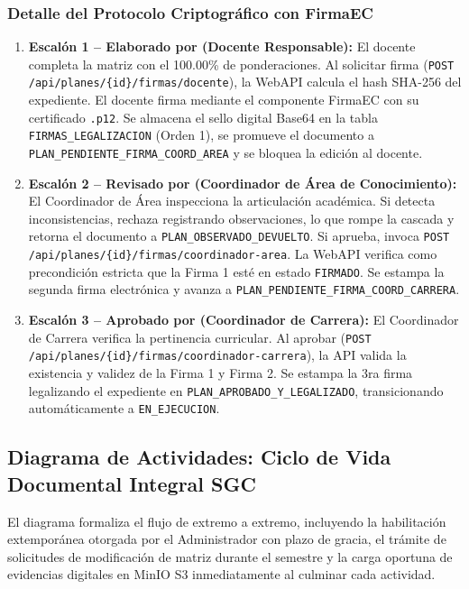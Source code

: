 \documentclass[12pt,a4paper]{article}
\begin{document}
\subsubsection{Detalle del Protocolo Criptográfico con FirmaEC}
\begin{enumerate}[leftmargin=1.5em, itemsep=1.5pt]
    \item \textbf{Escalón 1 -- Elaborado por (Docente Responsable):}
    El docente completa la matriz con el 100.00\% de ponderaciones. Al solicitar firma (\texttt{POST /api/planes/\{id\}/firmas/docente}), la WebAPI calcula el hash SHA-256 del expediente. El docente firma mediante el componente FirmaEC con su certificado \texttt{.p12}. Se almacena el sello digital Base64 en la tabla \texttt{FIRMAS\_LEGALIZACION} (Orden 1), se promueve el documento a \texttt{PLAN\_PENDIENTE\_FIRMA\_COORD\_AREA} y se bloquea la edición al docente.
    
    \item \textbf{Escalón 2 -- Revisado por (Coordinador de Área de Conocimiento):}
    El Coordinador de Área inspecciona la articulación académica. Si detecta inconsistencias, rechaza registrando observaciones, lo que rompe la cascada y retorna el documento a \texttt{PLAN\_OBSERVADO\_DEVUELTO}. Si aprueba, invoca \texttt{POST /api/planes/\{id\}/firmas/coordinador-area}. La WebAPI verifica como precondición estricta que la Firma 1 esté en estado \texttt{FIRMADO}. Se estampa la segunda firma electrónica y avanza a \texttt{PLAN\_PENDIENTE\_FIRMA\_COORD\_CARRERA}.
    
    \item \textbf{Escalón 3 -- Aprobado por (Coordinador de Carrera):}
    El Coordinador de Carrera verifica la pertinencia curricular. Al aprobar (\texttt{POST /api/planes/\{id\}/firmas/coordinador-carrera}), la API valida la existencia y validez de la Firma 1 y Firma 2. Se estampa la 3ra firma legalizando el expediente en \texttt{PLAN\_APROBADO\_Y\_LEGALIZADO}, transicionando automáticamente a \texttt{EN\_EJECUCION}.
\end{enumerate}

\subsection{Diagrama de Actividades: Ciclo de Vida Documental Integral SGC}
El diagrama formaliza el flujo de extremo a extremo, incluyendo la habilitación extemporánea otorgada por el Administrador con plazo de gracia, el trámite de solicitudes de modificación de matriz durante el semestre y la carga oportuna de evidencias digitales en MinIO S3 inmediatamente al culminar cada actividad.
\end{document}
